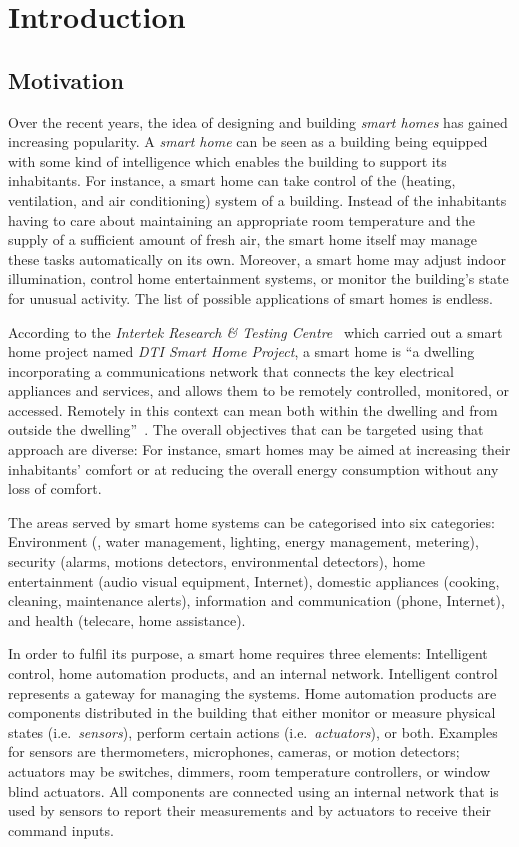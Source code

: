 \chapter{Introduction}
\label{ch:intro}

\section{Motivation}
\label{sec:motivation}

Over the recent years, the idea of designing and building \emph{smart homes} has gained increasing popularity. A \emph{smart home} can be seen as a building being equipped with some kind of intelligence which enables the building to support its inhabitants. For instance, a smart home can take control of the  (heating, ventilation, and air conditioning) system of a building. Instead of the inhabitants having to care about maintaining an appropriate room temperature and the supply of a sufficient amount of fresh air, the smart home itself may manage these tasks automatically on its own. Moreover, a smart home may adjust indoor illumination, control home entertainment systems, or monitor the building's state for unusual activity. The list of possible applications of smart homes is endless.

According to the \emph{Intertek Research \& Testing Centre}~\cite{intertek} which carried out a smart home project named \emph{DTI Smart Home Project}, a smart home is ``a dwelling incorporating a communications network that connects the key electrical appliances and services, and allows them to be remotely controlled, monitored, or accessed. Remotely in this context can mean both within the dwelling and from outside the dwelling''~\cite{SmartHomeDefinition,SmartHomeResearch}. The overall objectives that can be targeted using that approach are diverse: For instance, smart homes may be aimed at increasing their inhabitants' comfort or at reducing the overall energy consumption without any loss of comfort.

The areas served by smart home systems can be categorised into six categories: Environment (, water management, lighting, energy management, metering), security (alarms, motions detectors, environmental detectors), home entertainment (audio visual equipment, Internet), domestic appliances (cooking, cleaning, maintenance alerts), information and communication (phone, Internet), and health (telecare, home assistance).

In order to fulfil its purpose, a smart home requires three elements: Intelligent control, home automation products, and an internal network. Intelligent control represents a gateway for managing the systems. Home automation products are components distributed in the building that either monitor or measure physical states (i.e.\ \emph{sensors}), perform certain actions (i.e.\ \emph{actuators}), or both. Examples for sensors are thermometers, microphones, cameras, or motion detectors; actuators may be switches, dimmers, room temperature controllers, or window blind actuators. All components are connected using an internal network that is used by sensors to report their measurements and by actuators to receive their command inputs.

